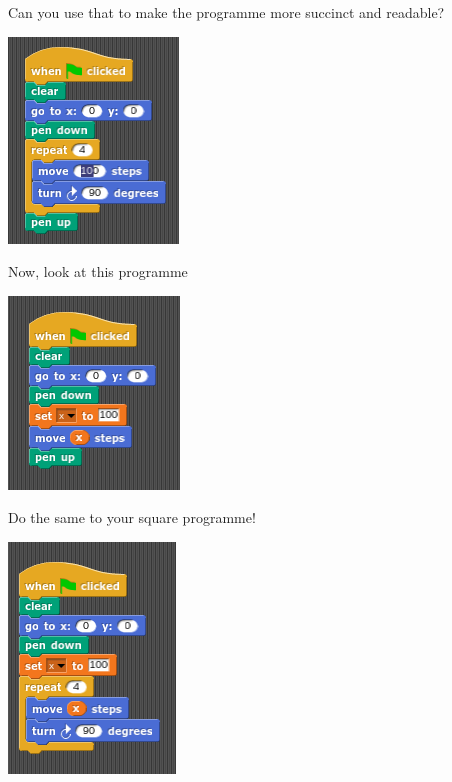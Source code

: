 \documentclass[11pt,a4paper]{scrartcl}
\begin{document}
Can you use that to make the programme more succinct and readable? 
\begin{center}
\includegraphics{repeat_square.png}
\end{center}


Now, look at this programme
\begin{center}
\includegraphics{variable.png}
\end{center}
Do the same to your square programme!
\begin{center}
\includegraphics{variable_square.png}
\end{center}
\end{document}
